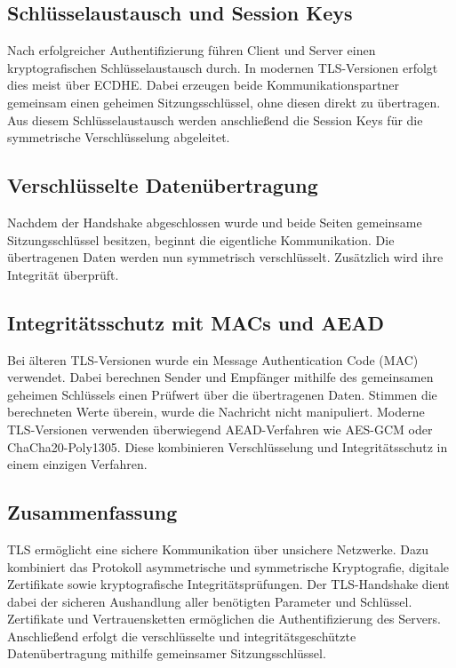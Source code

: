 \subsection*{Schlüsselaustausch und Session Keys}
Nach erfolgreicher Authentifizierung führen Client und Server einen kryptografischen Schlüsselaustausch durch. In modernen TLS-Versionen erfolgt dies meist über ECDHE. Dabei erzeugen beide Kommunikationspartner gemeinsam einen geheimen Sitzungsschlüssel, ohne diesen direkt zu übertragen. Aus diesem Schlüsselaustausch werden anschließend die Session Keys für die symmetrische Verschlüsselung abgeleitet.

\subsection*{Verschlüsselte Datenübertragung}
Nachdem der Handshake abgeschlossen wurde und beide Seiten gemeinsame Sitzungsschlüssel besitzen, beginnt die eigentliche Kommunikation. Die übertragenen Daten werden nun symmetrisch verschlüsselt. Zusätzlich wird ihre Integrität überprüft.

\subsection*{Integritätsschutz mit MACs und AEAD}
Bei älteren TLS-Versionen wurde ein Message Authentication Code (MAC) verwendet. Dabei berechnen Sender und Empfänger mithilfe des gemeinsamen geheimen Schlüssels einen Prüfwert über die übertragenen Daten. Stimmen die berechneten Werte überein, wurde die Nachricht nicht manipuliert. Moderne TLS-Versionen verwenden überwiegend AEAD-Verfahren wie AES-GCM oder ChaCha20-Poly1305. Diese kombinieren Verschlüsselung und Integritätsschutz in einem einzigen Verfahren.

\subsection{Zusammenfassung}
TLS ermöglicht eine sichere Kommunikation über unsichere Netzwerke. Dazu kombiniert das Protokoll asymmetrische und symmetrische Kryptografie, digitale Zertifikate sowie kryptografische Integritätsprüfungen.
Der TLS-Handshake dient dabei der sicheren Aushandlung aller benötigten Parameter und Schlüssel. Zertifikate und Vertrauensketten ermöglichen die Authentifizierung des Servers. Anschließend erfolgt die verschlüsselte und integritätsgeschützte Datenübertragung mithilfe gemeinsamer Sitzungsschlüssel.
